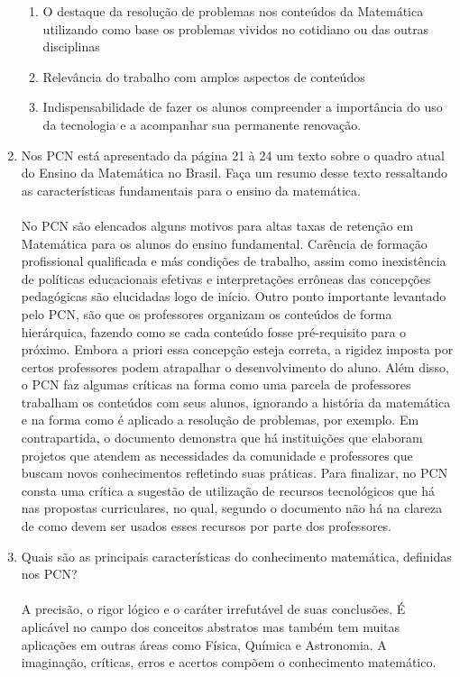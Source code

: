 \documentclass[a4paper, 12pt]{article}
\begin{document}
\begin{enumerate}
\begin{enumerate}
  \item O destaque da resolução de problemas nos conteúdos da Matemática utilizando como base os problemas vividos no cotidiano ou das outras disciplinas
  \item Relevância do trabalho com amplos aspectos de conteúdos
  \item Indispensabilidade de fazer os alunos compreender a importância do uso da tecnologia e a acompanhar sua permanente renovação.
  \end{enumerate}
\item Nos PCN está apresentado da página 21 à 24 um texto sobre o quadro atual do Ensino da Matemática no Brasil. Faça um resumo desse texto ressaltando as características fundamentais para o ensino da matemática. \\ \\
  No PCN são elencados alguns motivos para altas taxas de retenção em Matemática para os alunos do ensino fundamental. Carência de formação profissional qualificada e más condições de trabalho, assim como inexistência de políticas educacionais efetivas e interpretações errôneas das concepções pedagógicas são elucidadas logo de início. Outro ponto importante levantado pelo PCN, são que os professores organizam os conteúdos de forma hierárquica, fazendo como se cada conteúdo fosse pré-requisito para o próximo. Embora a priori essa concepção esteja correta, a rigidez imposta por certos professores podem atrapalhar o desenvolvimento do aluno. Além disso, o PCN faz algumas críticas na forma como uma parcela de professores trabalham os conteúdos com seus alunos, ignorando a história da matemática e na forma como é aplicado a resolução de problemas, por exemplo.
  Em contrapartida, o documento demonstra que há instituições que elaboram projetos que atendem as necessidades da comunidade e professores que buscam novos conhecimentos refletindo suas práticas.
  Para finalizar, no PCN consta uma crítica a sugestão de utilização de recursos tecnológicos que há nas propostas curriculares, no qual, segundo o documento não há na clareza de como devem ser usados esses recursos por parte dos professores.
\item Quais são as principais características do conhecimento matemática, definidas nos PCN? \\ \\
   A precisão, o rigor lógico e o caráter irrefutável de suas conclusões. É aplicável no campo dos conceitos abstratos mas também tem muitas aplicações em outras áreas como Física, Química e Astronomia. A imaginação, críticas, erros e acertos compõem o conhecimento matemático.

\end{enumerate}
\end{document}
